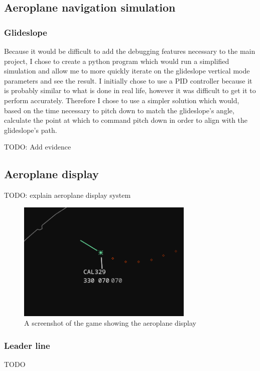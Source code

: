 \documentclass{article}
\begin{document}
\subsection{Aeroplane navigation simulation}
\subsubsection{Glideslope}
Because it would be difficult to add the debugging features necessary to the main project, I chose to create a python program which would run a simplified simulation and allow me to more quickly iterate on the glideslope vertical mode parameters and see the result.
I initially chose to use a PID controller\cite{pidcontroller} because it is probably similar to what is done in real life, however it was difficult to get it to perform accurately.
Therefore I chose to use a simpler solution which would, based on the time necessary to pitch down to match the glideslope's angle, calculate the point at which to command pitch down in order to align with the glideslope's path.

TODO: Add evidence


\subsection{Aeroplane display}
TODO: explain aeroplane display system
\begin{figure}[H]
\centering
\includegraphics[width=0.75\textwidth]{screenshots/aeroplane.png}
\caption{\label{fig:aeroplane}A screenshot of the game showing the aeroplane display}
\end{figure}

\subsubsection{Leader line}
TODO
\end{document}
